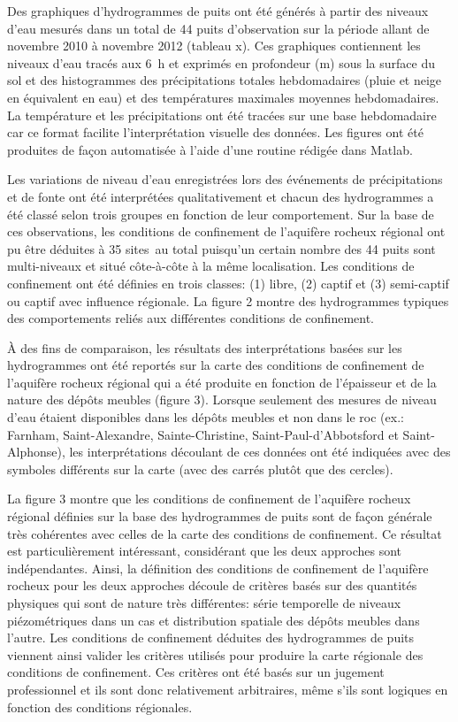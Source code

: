 \documentclass[WHATMANUAL.tex]{subfiles}
\begin{document}
Des graphiques d'hydrogrammes de puits ont été générés à partir des niveaux d'eau mesurés dans un total de 44 puits d'observation sur la période allant de novembre 2010 à novembre 2012 (tableau x). Ces graphiques contiennent les niveaux d'eau tracés aux 6 h et exprimés en profondeur (m) sous la surface du sol et des histogrammes des précipitations totales hebdomadaires (pluie et neige en équivalent en eau) et des températures maximales moyennes hebdomadaires. La température et les précipitations ont été tracées sur une base hebdomadaire car ce format facilite l'interprétation visuelle des données. Les figures ont été produites de façon automatisée à l'aide d'une routine rédigée dans Matlab.

Les variations de niveau d'eau enregistrées lors des événements de précipitations et de fonte ont été interprétées qualitativement et chacun des hydrogrammes a été classé selon trois groupes en fonction de leur comportement. Sur la base de ces observations, les conditions de confinement de l’aquifère rocheux régional ont pu être déduites à 35 sites au total puisqu’un certain nombre des 44 puits sont multi-niveaux et situé côte-à-côte à la même localisation. Les conditions de confinement ont été définies en trois classes: (1) libre, (2) captif et (3) semi-captif ou captif avec influence régionale. La figure 2 montre des hydrogrammes typiques des comportements reliés aux différentes conditions de confinement.

À des fins de comparaison, les résultats des interprétations basées sur les hydrogrammes ont été reportés sur la carte des conditions de confinement de l’aquifère rocheux régional qui a été produite en fonction de l'épaisseur et de la nature des dépôts meubles (figure 3). Lorsque seulement des mesures de niveau d’eau étaient disponibles dans les dépôts meubles et non dans le roc (ex.: Farnham, Saint-Alexandre, Sainte-Christine, Saint-Paul-d'Abbotsford et Saint-Alphonse), les interprétations découlant de ces données ont été indiquées avec des symboles différents sur la carte (avec des carrés plutôt que des cercles).

La figure 3 montre que les conditions de confinement de l’aquifère rocheux régional définies sur la base des hydrogrammes de puits sont de façon générale très cohérentes avec celles de la carte des conditions de confinement. Ce résultat est particulièrement intéressant, considérant que les deux approches sont indépendantes. Ainsi, la définition des conditions de confinement de l’aquifère rocheux pour les deux approches découle de critères basés sur des quantités physiques qui sont de nature très différentes: série temporelle de niveaux piézométriques dans un cas et distribution spatiale des dépôts meubles dans l'autre. Les conditions de confinement déduites des hydrogrammes de puits viennent ainsi valider les critères utilisés pour produire la carte régionale des conditions de confinement. Ces critères ont été basés sur un jugement professionnel et ils sont donc relativement arbitraires, même s’ils sont logiques en fonction des conditions régionales.
\end{document}
